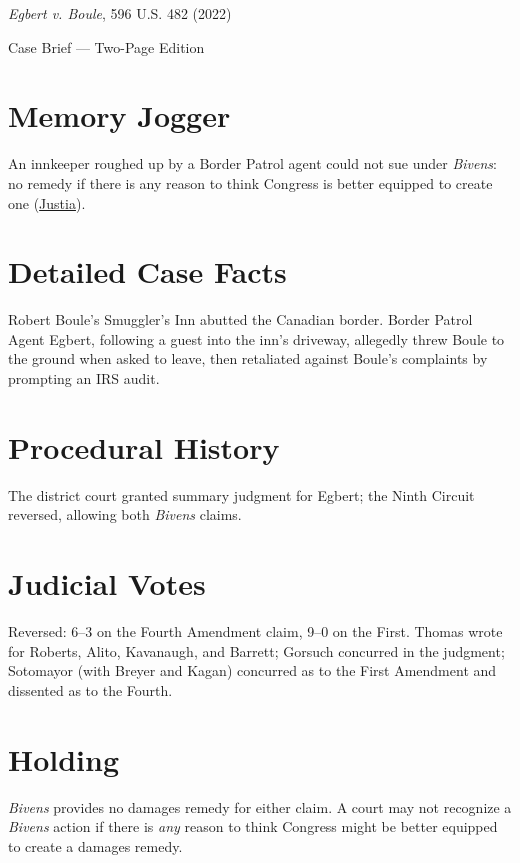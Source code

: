 \documentclass[12pt]{article}
\begin{document}
\begin{center}
{\LARGE \textit{Egbert v. Boule}, 596 U.S. 482 (2022)\par}
\vspace{0.5em}
{\large Case Brief --- Two-Page Edition\par}
\end{center}

\section{Memory Jogger}
An innkeeper roughed up by a Border Patrol agent could not sue under \textit{Bivens}: no remedy if there is any reason to think Congress is better equipped to create one (\href{https://supreme.justia.com/cases/federal/us/596/21-147/}{Justia}).

\section{Detailed Case Facts}
Robert Boule's Smuggler's Inn abutted the Canadian border. Border Patrol Agent Egbert, following a guest into the inn's driveway, allegedly threw Boule to the ground when asked to leave, then retaliated against Boule's complaints by prompting an IRS audit.

\section{Procedural History}
The district court granted summary judgment for Egbert; the Ninth Circuit reversed, allowing both \textit{Bivens} claims.

\section{Judicial Votes}
Reversed: 6--3 on the Fourth Amendment claim, 9--0 on the First. Thomas wrote for Roberts, Alito, Kavanaugh, and Barrett; Gorsuch concurred in the judgment; Sotomayor (with Breyer and Kagan) concurred as to the First Amendment and dissented as to the Fourth.

\section{Holding}
\textit{Bivens} provides no damages remedy for either claim. A court may not recognize a \textit{Bivens} action if there is \textit{any} reason to think Congress might be better equipped to create a damages remedy.
\end{document}
